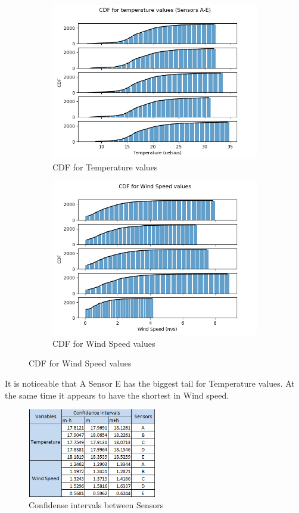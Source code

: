 \documentclass[a4paper,12pt]{article} %
\begin{document}
\begin{figure}[H] %
	\centering %
	\begin{subfigure}[b]{0.4\linewidth}
		\includegraphics[width=0.9\linewidth]{Figure_9.png} 
		\caption{CDF for Temperature values}
	\end{subfigure}
	\begin{subfigure}[b]{0.4\linewidth}
		\includegraphics[width=0.9\linewidth]{Figure_18.png} 
		\caption{CDF for Wind Speed values}
	\end{subfigure}
\end{figure}

It is noticeable that A Sensor E has the biggest tail for Temperature values. At the same time it appears to have the shortest in Wind speed.

\begin{figure}[H] %
	\centering %
	\includegraphics[width=0.5\textwidth]{Confidence_intervals.png} 
	\caption{Confidense intervals between Sensors} %
\end{figure}
\end{document}
